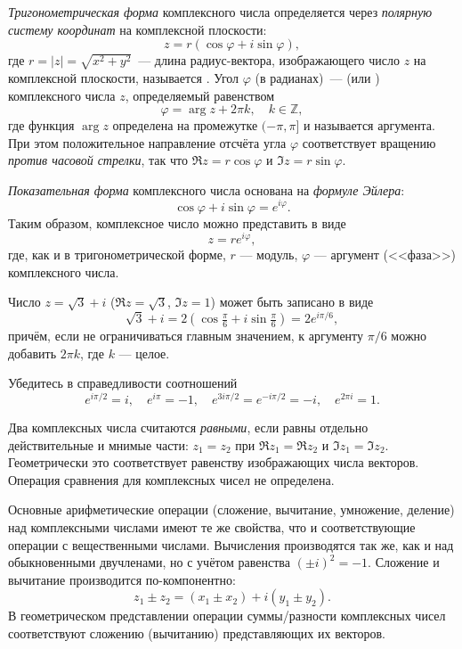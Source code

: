\begin{booksupplement}
    \emph{Тригонометрическая форма} комплексного числа определяется через
    \emph{полярную систему координат} на комплексной плоскости:
    \[
        z = r\left(\cos\varphi + i\sin\varphi\right),
    \]
где $r = \left| z \right| = \sqrt{x^{2} + y^{2}}$~--- длина
    радиус-вектора, изображающего число $z$ на комплексной плоскости,
    называется . Угол $\varphi$ (в радианах)~---
     (или ) комплексного числа $z$, определяемый равенством
    \[
        \varphi = \arg z + 2 \pi k,\quad k \in \mathbb{Z},
    \]
    где функция $\arg z$ определена на промежутке $(-\pi,\pi]$
    и называется  аргумента.
    При этом положительное направление отсчёта угла $\varphi$
    соответствует вращению \emph{против часовой стрелки}, так что
    $\Re z = r\cos\varphi$ и $\Im z = r\sin\varphi$.

    \emph{Показательная форма} комплексного числа основана на \emph{формуле
    Эйлера}:
    \[
\cos \varphi + i \sin \varphi = e^{i\varphi}.
    \]
    Таким образом, комплексное число можно представить в виде
    \[
    z = re^{i\varphi},
    \]
    где, как и в тригонометрической форме, $r$ --- модуль, $\varphi$ ---
    аргумент (<<фаза>>) комплексного числа.

    \begin{lab:example}
    Число $z=\sqrt{3} + i$ ($\Re z = \sqrt{3}$, $\Im z = 1$) может быть 
    записано в виде
    \[
        \sqrt{3} + i = 2\left(\cos\tfrac{\pi}{6} + i\sin\tfrac{\pi}{6}\right) =
        2e^{i\pi/6},
    \]
    причём, если не ограничиваться главным значением,
    к аргументу $\pi/6$ можно добавить $2\pi k$, где $k$ --- целое.
    \end{lab:example}

    \begin{lab:exercise}
     Убедитесь в справедливости соотношений
     \[
      e^{i\pi/2} = i,\quad e^{i\pi} = -1,\quad e^{3i\pi/2} = e^{-i\pi/2} =-i,\quad
      e^{2\pi i} = 1.
     \]
    \end{lab:exercise}

    Два комплексных числа считаются
    \emph{равными}, если равны отдельно действительные и мнимые части:
    $z_1 = z_2$ при $\Re z_1=\Re z_2$ и $\Im z_1=\Im z_2$. Геометрически
    это соответствует равенству изображающих числа векторов.
    Операция сравнения для комплексных чисел не определена.




    Основные арифметические операции (сложение, вычитание, умножение, деление)
    над комплексными числами имеют те же свойства, что и соответствующие операции с вещественными числами.
    Вычисления производятся так же, как и над обыкновенными двучленами,
    но с учётом равенства $(\pm i)^{2} = - 1$.
    Сложение и вычитание производится по-компонентно:
    \[
     z_1 \pm z_2 = (x_1 \pm x_2) + i (y_1 \pm y_2).
    \]
    В геометрическом представлении операции суммы/разности комплексных чисел соответствуют
    сложению (вычитанию) представляющих их векторов.


\end{booksupplement}
